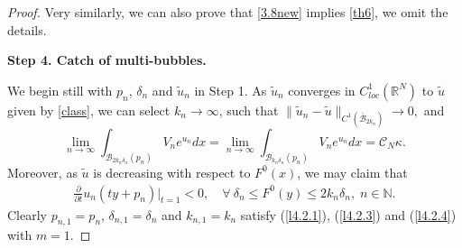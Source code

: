 \documentclass[11pt]{amsart}
\numberwithin{equation}{section}
\newcommand{\N}{\mathbb{N}}
\begin{document}
\begin{proof}
Very similarly, we can also prove that \eqref{3.8new} implies \eqref{th6}, we omit the details.

\medskip
\textbf{Step 4. Catch of multi-bubbles.}

We begin still with $p_n$, $\delta_n$ and $\widetilde u_n$ in Step 1. As $\widetilde{u}_{n}$ converges in $C^{1}_{loc}(\mathbb{R}^{N})$ to $\widetilde{u}$ given by \eqref{class}, we can select $k_{n}\rightarrow\infty$, such that $\| \widetilde{u}_{n}^{}-\widetilde{u}\|_{C^{1}(\overline{\mathcal{B}}_{2k_{n}})}\rightarrow0,$ and
$$\lim_{n\to\infty}\int_{\mathcal{B}_{2k_{n}\delta_{n}}(p_n)}V_{n}e^{u_{n}}dx =\lim_{n\to\infty}\int_{\mathcal{B}_{k_{n}\delta_{n}}(p_n)}V_{n}e^{u_{n}}dx = \mathcal{C}_{N}\kappa.$$
Moreover, as $\widetilde{u}$ is decreasing with respect to $F^0(x)$, we may claim that
\begin{align*}
\frac{\partial}{\partial t}u_{n}(ty+p_n)|_{t=1}<0,\quad\forall~\delta_{n}\leq F^{0}(y)\leq2k_{n}\delta_{n}, \; n\in \N.
\end{align*}
Clearly $p_{n, 1} = p_n$, $\delta_{n, 1} = \delta_n$ and $k_{n, 1} = k_n$ satisfy (\ref{l4.2.1}), (\ref{l4.2.3}) and (\ref{l4.2.4}) with $m=1$.


\end{proof}
\end{document}
